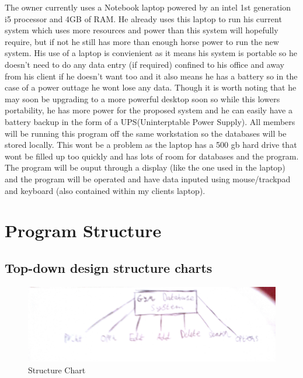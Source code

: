 The owner currently uses a Notebook laptop powered by an intel 1st generation
i5 processor and 4GB of RAM. He already uses this laptop to run his current
system which uses more resources and power than this system will hopefully
require, but if not he still has more than enough horse power to run the new
system. His use of a laptop is convienient as it means his system is portable
so he doesn’t need to do any data entry (if required) confined to his office and
away from his client if he doesn’t want too and it also means he has a battery so
in the case of a power outtage he wont lose any data. Though it is worth noting
that he may soon be upgrading to a more powerful desktop soon so while this
lowers portability, he has more power for the proposed system and he can easily
have a battery backup in the form of a UPS(Uninterptable Power Supply).
All members will be running this program off the same workstation so the
databases will be stored locally. This wont be a problem as the laptop has a 500 gb hard drive that wont be filled up too quickly and has lots of room for databases and the program. The program will be ouput through a display (like the one used in the laptop) and the program will be operated and have data inputed using mouse/trackpad and keyboard (also contained within my clients laptop). 



\section{Program Structure}

\subsection{Top-down design structure charts}

\begin{figure}[H]
    \includegraphics[width=\textwidth]{StructureChart1.jpg}
    \caption{Structure Chart} \label{fig:StructureChart}
\end{figure}

